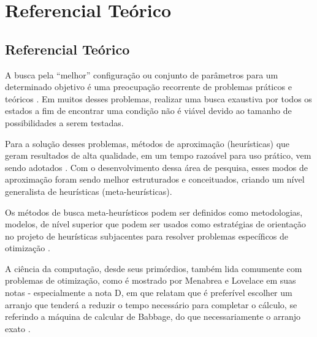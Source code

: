 \part{Referencial Teórico}

\chapter[Referencial Teórico]{Referencial Teórico}

A busca pela ``melhor'' configuração ou conjunto de parâmetros para um
determinado objetivo é uma preocupação recorrente de problemas práticos e
teóricos \cite{combinatorialoptimization1998}. Em muitos desses problemas,
realizar uma busca exaustiva por todos os estados a fim de encontrar uma
condição não é viável devido ao tamanho de possibilidades a serem testadas. 

Para a solução desses problemas, métodos de aproximação (heurísticas) que geram
resultados de alta qualidade, em um tempo razoável para uso prático, vem sendo
adotados \cite{gendreau2005metaheuristics}. Com o desenvolvimento dessa área de
pesquisa, esses modos de aproximação foram sendo melhor estruturados e
conceituados, criando um nível generalista de heurísticas (meta-heurísticas).


Os métodos de busca meta-heurísticos podem ser definidos como metodologias,
modelos, de nível superior que podem ser usados como estratégias de orientação
no projeto de heurísticas subjacentes para resolver problemas específicos de
otimização \cite{talbi2009metaheuristics}.


A ciência da computação, desde seus primórdios, também lida comumente com
problemas de otimização, como é mostrado por Menabrea e Lovelace em suas notas -
especialmente a nota D, em que relatam que é preferível escolher um arranjo que
tenderá a reduzir o tempo necessário para completar o cálculo, se referindo a
máquina de calcular de Babbage, do que necessariamente o arranjo exato
\cite{menabrea1842sketch}.

